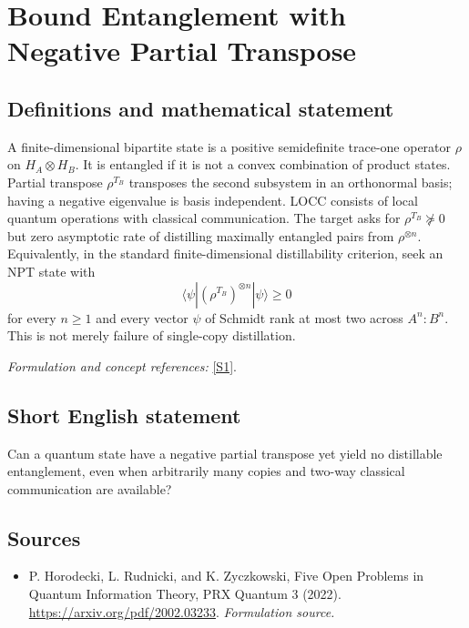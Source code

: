 \documentclass[11pt]{article}
\begin{document}
\section*{\texorpdfstring{Bound Entanglement with Negative Partial Transpose}{Bound Entanglement with Negative Partial Transpose}}\label{8200004}
\subsection{Definitions and mathematical statement}
A finite-dimensional bipartite state is a positive semidefinite trace-one operator $\rho$ on $H_A\otimes H_B$. It is entangled if it is not a convex combination of product states. Partial transpose $\rho^{T_B}$ transposes the second subsystem in an orthonormal basis; having a negative eigenvalue is basis independent. LOCC consists of local quantum operations with classical communication. The target asks for $\rho^{T_B}\not\succeq0$ but zero asymptotic rate of distilling maximally entangled pairs from $\rho^{\otimes n}$. Equivalently, in the standard finite-dimensional distillability criterion, seek an NPT state with
\[
 \langle\psi|(\rho^{T_B})^{\otimes n}|\psi\rangle\ge0
\]
for every $n\ge1$ and every vector $\psi$ of Schmidt rank at most two across $A^n:B^n$. This is not merely failure of single-copy distillation.
\par\smallskip\textit{Formulation and concept references:} \href{https://arxiv.org/pdf/2002.03233}{[S1]}.

\subsection{Short English statement}
Can a quantum state have a negative partial transpose yet yield no distillable entanglement, even when arbitrarily many copies and two-way classical communication are available?
\subsection{Sources}
\begin{itemize}
\item[S1]P. Horodecki, L. Rudnicki, and K. Zyczkowski, Five Open Problems in Quantum Information Theory, PRX Quantum 3 (2022).
\url{https://arxiv.org/pdf/2002.03233}.
\textit{Formulation source.}
\end{itemize}
\end{document}
